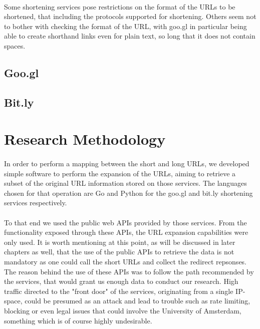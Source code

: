 \documentclass[12pt]{article}
\begin{document}
\paragraph{}
Some shortening services pose restrictions on the format of the URLs to be shortened, that including the protocols supported for shortening. Others seem not to bother with checking the format of the URL, with goo.gl in particular being able to create shorthand links even for plain text, so long that it does not contain spaces. 

\subsection{Goo.gl}

\subsection{Bit.ly}
	
\section{Research Methodology}

\paragraph{}
In order to perform a mapping between the short and long URLs, we developed simple software to perform the expansion of the URLs, aiming to retrieve a subset of the original URL information stored on those services. The languages chosen for that operation are Go and Python for the goo.gl and bit.ly shortening services respectively. 

\paragraph{}
To that end we used the public web APIs provided by those services. From the functionality exposed through these APIs, the URL expansion capabilities were only used. It is worth mentioning at this point, as will be discussed in later chapters as well, that the use of the public APIs to retrieve the data is not mandatory as one could call the short URLs and collect the redirect repsonses. The reason behind the use of these APIs was to follow the path recommended by the services, that would grant us enough data to conduct our research. High traffic directed to the "front door" of the services, originating from a single IP-space, could be presumed as an attack and lead to trouble such as rate limiting, blocking or even legal issues that could involve the University of Amsterdam, something which is of course highly undesirable. 
\end{document}
